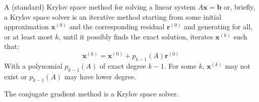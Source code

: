 \begin{definitionbox}
    A (standard) Krylov space method for solving a linear system $A\mathbf{x} = \mathbf{b}$ or, briefly, a Krylov space solver is an iterative method starting from some initial approximation $\mathbf{x}^{\left(0\right)}$ and the corresponding residual $\mathbf{r}^{\left(0\right)}$ and generating for all, or at least most $k$, until it possibly finds the exact solution, iterates $\mathbf{x}^{\left(k\right)}$ such that:
    \begin{equation}
        \mathbf{x}^{\left(k\right)} = \mathbf{x}^{\left(0\right)} + p_{k-1} \left(A\right)\mathbf{r}^{\left(0\right)}
    \end{equation}
    With a polynomial $p_{k-1}\left(A\right)$ of exact degree $k-1$. For some $k$, $\mathbf{x}^{\left(k\right)}$ may not exist or $p_{k-1}\left(A\right)$ may have lower degree.
\end{definitionbox}

\noindent
The conjugate gradient method is a Krylov space solver.